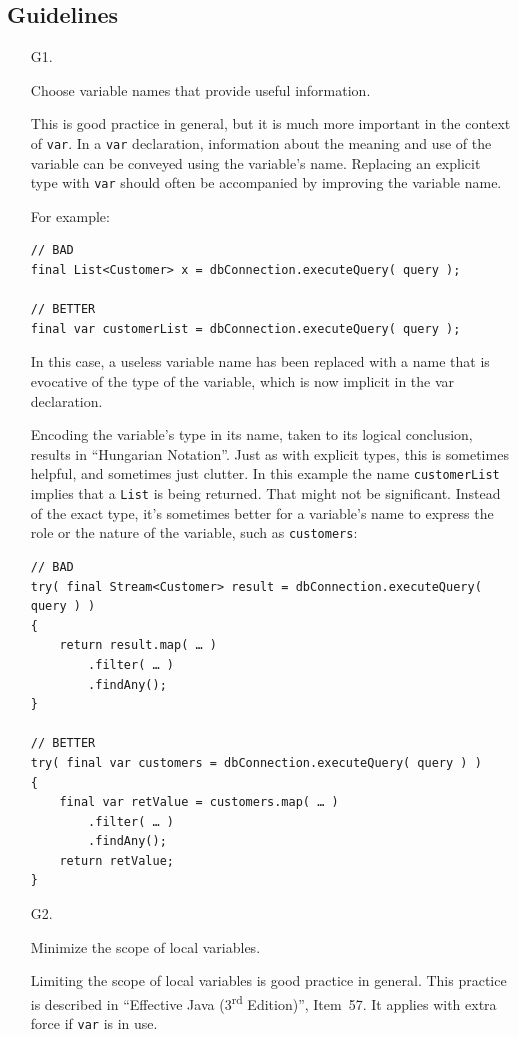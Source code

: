 \documentclass[11pt,a4paper, titlepage, parskip=half, headsepline, footsepline, cleardoublepage=current, headheight=1cm]{scrbook}
\begin{document}
\subsection{Guidelines}
\begin{enumerate}
\item[G1.]{Choose variable names that provide useful information.

This is good practice in general, but it is much more important in the context of \lstinline|var|. In a \lstinline|var| declaration, information about the meaning and use of the variable can be conveyed using the variable's name. Replacing an explicit type with \lstinline|var| should often be accompanied by improving the variable name.

For example:

\begin{lstlisting}
// BAD
final List<Customer> x = dbConnection.executeQuery( query );

// BETTER
final var customerList = dbConnection.executeQuery( query );
\end{lstlisting}

In this case, a useless variable name has been replaced with a name that is evocative of the type of the variable, which is now implicit in the var declaration.

Encoding the variable's type in its name, taken to its logical conclusion, results in “Hungarian Notation”. Just as with explicit types, this is sometimes helpful, and sometimes just clutter. In this example the name \lstinline|customerList| implies that a \lstinline|List| is being returned. That might not be significant. Instead of the exact type, it’s sometimes better for a variable’s name to express the role or the nature of the variable, such as \lstinline|customers|:

\begin{lstlisting}
// BAD
try( final Stream<Customer> result = dbConnection.executeQuery( query ) ) 
{
    return result.map( … )
        .filter( … )
        .findAny();
}

// BETTER
try( final var customers = dbConnection.executeQuery( query ) ) 
{
    final var retValue = customers.map( … )
        .filter( … )
        .findAny();
    return retValue;
}
\end{lstlisting}}

\item[G2.]{Minimize the scope of local variables.

Limiting the scope of local variables is good practice in general. This practice is described in “Effective Java (3\textsuperscript{rd} Edition)”\autocite{Bloch:EffectiveJava}, Item~57. It applies with extra force if \lstinline|var| is in use.

}
\end{enumerate}
\end{document}
